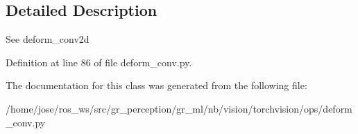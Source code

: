 \subsection{Detailed Description}
\begin{DoxyVerb}See deform_conv2d
\end{DoxyVerb}
 

Definition at line 86 of file deform\+\_\+conv.\+py.



The documentation for this class was generated from the following file\+:\begin{DoxyCompactItemize}
\item 
/home/jose/ros\+\_\+ws/src/gr\+\_\+perception/gr\+\_\+ml/nb/vision/torchvision/ops/deform\+\_\+conv.\+py\end{DoxyCompactItemize}
